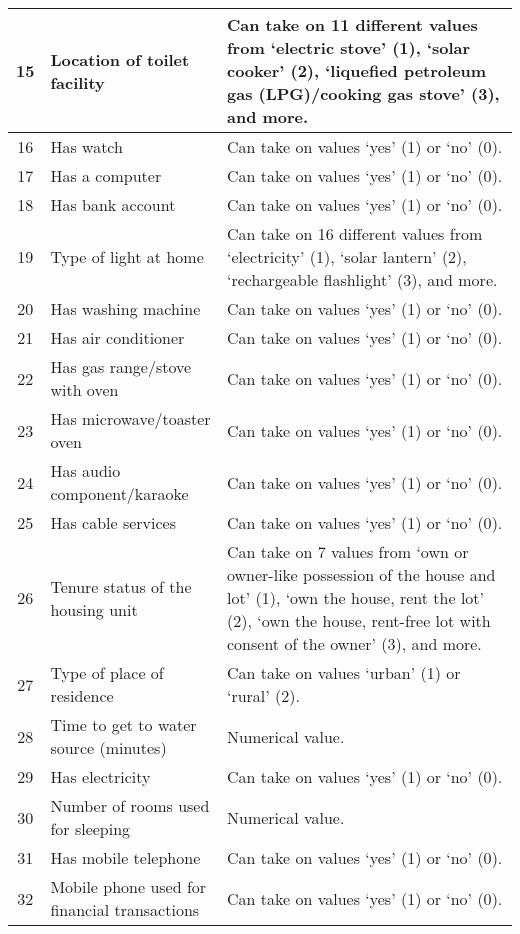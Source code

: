 \documentclass[a4paper,fleqn]{cas-sc}
\begin{document}
\begin{longtable}{c p{5cm} p{9cm}}
    15 & Location of toilet facility & Can take on 11 different values from ‘electric stove’ (1), ‘solar cooker’ (2), ‘liquefied petroleum gas (LPG)/cooking gas stove’ (3), and more. \\ \midrule
    16 & Has watch & Can take on values ‘yes’ (1) or ‘no’ (0). \\ \midrule
    17 & Has a computer & Can take on values ‘yes’ (1) or ‘no’ (0). \\ \midrule
    18 & Has bank account & Can take on values ‘yes’ (1) or ‘no’ (0). \\ \midrule
    19 & Type of light at home & Can take on 16 different values from ‘electricity’ (1), ‘solar lantern’ (2), ‘rechargeable flashlight’ (3), and more. \\ \midrule
    20 & Has washing machine & Can take on values ‘yes’ (1) or ‘no’ (0). \\ \midrule
    21 & Has air conditioner & Can take on values ‘yes’ (1) or ‘no’ (0). \\ \midrule
    22 & Has gas range/stove with oven & Can take on values ‘yes’ (1) or ‘no’ (0). \\ \midrule
    23 & Has microwave/toaster oven & Can take on values ‘yes’ (1) or ‘no’ (0). \\ \midrule
    24 & Has audio component/karaoke & Can take on values ‘yes’ (1) or ‘no’ (0). \\ \midrule
    25 & Has cable services & Can take on values ‘yes’ (1) or ‘no’ (0). \\ \midrule
    26 & Tenure status of the housing unit & Can take on 7 values from ‘own or owner-like possession of the house and lot’ (1), ‘own the house, rent the lot’ (2), ‘own the house, rent-free lot with consent of the owner’ (3), and more. \\ \midrule
    27 & Type of place of residence & Can take on values ‘urban’ (1) or ‘rural’ (2). \\ \midrule
    28 & Time to get to water source (minutes) & Numerical value. \\ \midrule
    29 & Has electricity & Can take on values ‘yes’ (1) or ‘no’ (0). \\ \midrule
    30 & Number of rooms used for sleeping & Numerical value. \\ \midrule
    31 & Has mobile telephone & Can take on values ‘yes’ (1) or ‘no’ (0). \\ \midrule
    32 & Mobile phone used for financial transactions & Can take on values ‘yes’ (1) or ‘no’ (0). \\ \midrule

\end{longtable}
\end{document}
